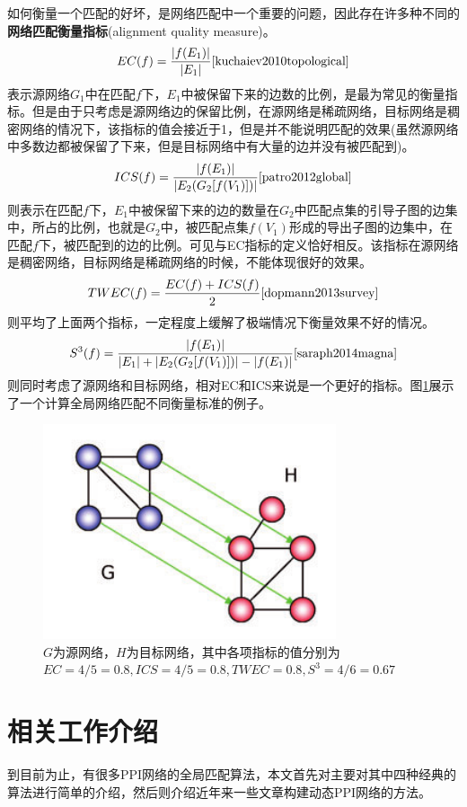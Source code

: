 如何衡量一个匹配的好坏，是网络匹配中一个重要的问题，因此存在许多种不同的\textbf{网络匹配衡量指标}(alignment quality measure)。
$$EC(f)=\frac{\left | f(E_1) \right |}{\left | E_1 \right |}\cite{kuchaiev2010topological}$$表示源网络$G_1$中在匹配$f$下，$E_1$中被保留下来的边数的比例，是最为常见的衡量指标。但是由于只考虑是源网络边的保留比例，在源网络是稀疏网络，目标网络是稠密网络的情况下，该指标的值会接近于1，但是并不能说明匹配的效果(虽然源网络中多数边都被保留了下来，但是目标网络中有大量的边并没有被匹配到)。
$$ICS(f)=\frac{\left | f(E_1) \right |}{\left |E_2(G_2[f(V_1)])\right |}\cite{patro2012global}$$则表示在匹配$f$下，$E_1$中被保留下来的边的数量在$G_2$中匹配点集的引导子图的边集中，所占的比例，也就是$G_2$中，被匹配点集$f(V_1)$形成的导出子图的边集中，在匹配$f$下，被匹配到的边的比例。可见与EC指标的定义恰好相反。该指标在源网络是稠密网络，目标网络是稀疏网络的时候，不能体现很好的效果。
$$TWEC(f)=\frac{EC(f)+ICS(f)}{2}\cite{dopmann2013survey}$$则平均了上面两个指标，一定程度上缓解了极端情况下衡量效果不好的情况。
$$S^{3}(f)=\frac{\left | f(E_1) \right |}{\left | E_1 \right |+\left | E_2(G_2[f(V_1)]) \right |-\left | f(E_1) \right |}\cite{saraph2014magna}$$则同时考虑了源网络和目标网络，相对EC和ICS来说是一个更好的指标。图\ref{fig:measure}展示了一个计算全局网络匹配不同衡量标准的例子。

\begin{figure}[htbp]
\centering
\includegraphics[height=0.25\textheight]{pic/measure.png}
\captionsetup{margin=50pt}
\caption{$G$为源网络，$H$为目标网络，其中各项指标的值分别为$EC=4/5=0.8,ICS=4/5=0.8,TWEC=0.8,S^3=4/6=0.67$ \cite{saraph2014magna} \label{fig:measure}}
\end{figure}

\section{相关工作介绍}
到目前为止，有很多PPI网络的全局匹配算法，本文首先对主要对其中四种经典的算法进行简单的介绍，然后则介绍近年来一些文章构建动态PPI网络的方法。
